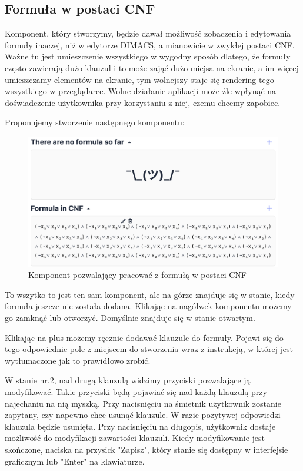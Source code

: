 \documentclass[a4paper,12pt,oneside]{book}
\theoremstyle{definition}
\begin{document}
\newpage

\subsection{Formuła w postaci CNF}

Komponent, który stworzymy, będzie dawał możliwość zobaczenia i edytowania formuły inaczej, niż w edytorze DIMACS, a mianowicie w zwykłej postaci CNF. Ważne tu jest umieszczenie wszystkiego w wygodny sposób dlatego, że formuły często zawierają dużo klauzul i to może zająć dużo miejsa na ekranie, a im więcej umieszczamy elementów na ekranie, tym wolnejszy staje się rendering tego wszystkiego w przeglądarce. Wolne działanie aplikacji może źle wpłynąć na doświadczenie użytkownika przy korzystaniu z niej, czemu chcemy zapobiec.

Proponujemy stworzenie następnego komponentu:

\begin{figure}[ht]
    \centering
    \includegraphics[width=14.30cm]{11}
    \caption{Komponent pozwalający pracować z formułą w postaci CNF}
    \label{fig:11}
\end{figure}

\noindent To wszytko to jest ten sam komponent, ale na górze znajduje się w stanie, kiedy formuła jeszcze nie została dodana. Klikając na nagółwek komponentu możemy go zamknąć lub otworzyć. Domyślnie znajduje się w stanie otwartym.

Klikając na plus możemy ręcznie dodawać klauzule do formuły. Pojawi się do tego odpowiednie pole z miejscem do stworzenia wraz z instrukcją, w której jest wytłumaczone jak to prawidłowo zrobić.

W stanie nr.2, nad drugą klauzulą widzimy przyciski pozwalające ją modyfikować. Takie przyciski będą pojawiać się nad każdą klauzulą przy najechaniu na nią myszką. Przy nacisnięciu na śmietnik użytkownik zostanie zapytany, czy napewno chce usunąć klauzule. W razie pozytywej odpowiedzi klauzula będzie usunięta. Przy nacisnięciu na długopis, użytkownik dostaje możliwość do modyfikacji zawartości klauzuli. Kiedy modyfikowanie jest skończone, naciska na przysick "Zapisz", który stanie się dostępny w interfejsie graficznym lub "Enter" na klawiaturze.
\end{document}
